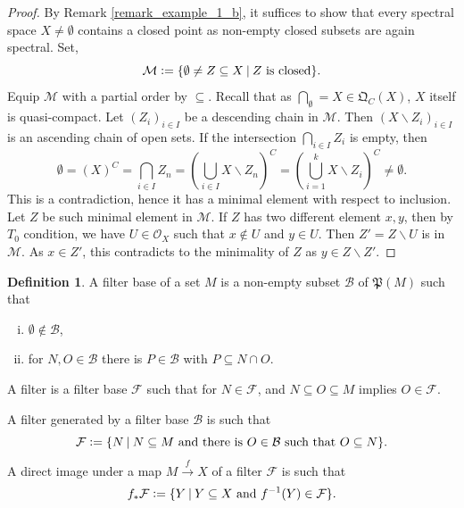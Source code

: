 \documentclass[10pt]{article}
\numberwithin{equation}{section}
\theoremstyle{definition}
\newtheorem{definition}{Definition}[subsection]
\newcommand{\defeq}{\vcentcolon=}
\newcommand{\Ouv}{\mathscr{O}}
\newcommand{\sep}[0]{\:|\:}
\newcommand{\QC}[0]{\mathfrak{Q}_C}
\begin{document}
\begin{proof}
    By Remark \ref{remark_example_1_b}, it suffices to show that every spectral space $X\not=\emptyset$ contains a closed point as non-empty closed subsets are again spectral. Set,
    \begin{equation*}
        \mathcal{M}\defeq\{\emptyset\not=Z\subseteq X\sep \text{$Z$ is closed}\}.
    \end{equation*}
    Equip $\mathcal{M}$ with a partial order by $\subseteq$. Recall that as $\bigcap_\emptyset = X\in\QC(X)$, $X$ itself is quasi-compact. Let $(Z_i)_{i\in I}$ be a descending chain in $\mathcal{M}$. Then $(X\backslash Z_i)_{i\in I}$ is an ascending chain of open sets. If the intersection $\bigcap_{i\in I}Z_i$ is empty, then
    \begin{equation*}
    \emptyset = (X)^C = \bigcap_{i\in I}Z_n = \left(\bigcup_{i\in I}X\backslash Z_n\right)^C = \left(\bigcup_{i=1}^k X\backslash Z_i\right)^C \not =\emptyset.
    \end{equation*}
    This is a contradiction, hence it has a minimal element with respect to inclusion. Let $Z$ be such minimal element in $\mathcal{M}$. If $Z$ has two different element $x,y$, then by $T_0$ condition, we have $U\in\Ouv_X$ such that $x\not\in U$ and $y\in U$. Then $Z'=Z\backslash U$ is in $\mathcal{M}$. As $x\in Z'$, this contradicts to the minimality of $Z$ as $y\in Z\backslash Z'$.
\end{proof}
\begin{definition}
    A filter base of a set $M$ is a non-empty subset $\mathcal{B}$ of $\mathfrak{P}(M)$ such that
    \begin{enumerate}[i.]
        \item $\emptyset\not\in\mathcal{B}$,
        \item for $N,O\in\mathcal{B}$ there is $P\in\mathcal{B}$ with $P\subseteq N\cap O$.
    \end{enumerate}
    A filter is a filter base $\mathcal{F}$ such that for $N\in\mathcal{F}$, and $N\subseteq O\subseteq M$ implies $O\in\mathcal{F}$.
    \par A filter generated by a filter base $\mathcal{B}$ is such that
    \begin{equation*}
        \mathcal{F} \defeq \{N\sep N\subseteq M\text{ and there is $O\in\mathcal{B}$ such that $O\subseteq N$}\}.
    \end{equation*}
    A direct image under a map $M\stackrel{f}{\to}X$ of a filter $\mathcal{F}$ is such that
    \begin{equation*}
        f_*\mathcal{F}\defeq\{Y\sep Y\subseteq X \text{ and } f^{-1}(Y)\in\mathcal{F}\}.
    \end{equation*}
\end{definition}
\end{document}
